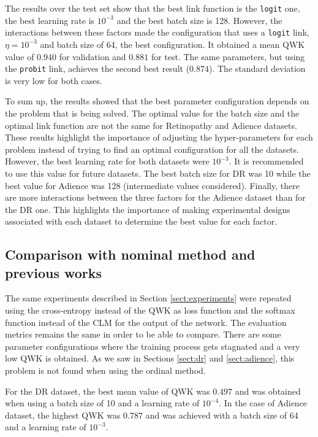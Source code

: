 \documentclass[journal]{IEEEtran}
\begin{document}
	The results over the test set show that the best link function is the \texttt{logit} one, the best learning rate is $10^{-3}$ and the best batch size is 128. However, the interactions between these factors made the configuration that uses a \texttt{logit} link, $\eta=10^{-3}$ and batch size of 64, the best configuration. It obtained a mean QWK value of $0.940$ for validation and $0.881$ for test. The same parameters, but using the \texttt{probit} link, achieves the second best result ($0.874$). The standard deviation is very low for both cases.
	
	To sum up, the results showed that the best parameter configuration depends on the problem that is being solved. The optimal value for the batch size and the optimal link function are not the same for Retinopathy and Adience datasets. These results highlight the importance of adjusting the hyper-parameters for each problem instead of trying to find an optimal configuration for all the datasets. However, the best learning rate for both datasets were $10^{-3}$. It is recommended to use this value for future datasets.
	The best batch size for DR was 10 while the best value for Adience was 128 (intermediate values considered).
	Finally, there are more interactions between the three factors for the Adience dataset than for the DR one. This highlights the importance of making experimental designs associated with each dataset to determine the best value for each factor.
	
	\subsection{Comparison with nominal method and previous works}
	\label{sect:NominalComparison}
	
	The same experiments described in Section \ref{sect:experiments} were repeated using the cross-entropy instead of the QWK as loss function and the softmax function instead of the CLM for the output of the network. The evaluation metrics remains the same in order to be able to compare. There are some parameter configurations where the training process gets stagnated and a very low QWK is obtained. As we saw in Sections \ref{sect:dr} and \ref{sect:adience}, this problem is not found when using the ordinal method.
	
	For the DR dataset, the best mean value of QWK was $0.497$ and was obtained when using a batch size of 10 and a learning rate of $10^{-4}$. In the case of Adience dataset, the highest QWK was $0.787$ and was achieved with a batch size of 64 and a learning rate of $10^{-3}$.
\end{document}

